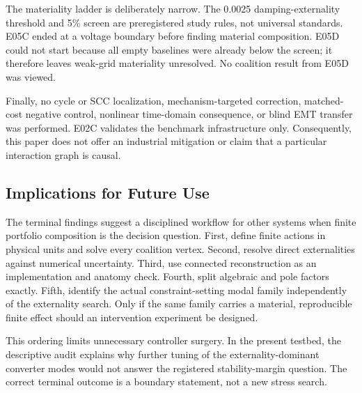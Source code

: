 The materiality ladder is deliberately narrow. The 0.0025 damping-externality
threshold and 5\% screen are preregistered study rules, not universal
standards. E05C ended at a voltage boundary before finding material
composition. E05D could not start because all empty baselines were already
below the screen; it therefore leaves weak-grid materiality unresolved. No
coalition result from E05D was viewed.

Finally, no cycle or SCC localization, mechanism-targeted correction,
matched-cost negative control, nonlinear time-domain consequence, or blind EMT
transfer was performed. E02C validates the benchmark infrastructure only.
Consequently, this paper does not offer an industrial mitigation or claim that
a particular interaction graph is causal.

\subsection{Implications for Future Use}

The terminal findings suggest a disciplined workflow for other systems when
finite portfolio composition is the decision question.
First, define finite actions in physical units and solve every coalition
vertex. Second, resolve direct externalities against numerical uncertainty.
Third, use connected reconstruction as an implementation and anatomy check.
Fourth, split algebraic and pole factors exactly. Fifth, identify the actual
constraint-setting modal family independently of the externality search.
Only if the same family carries a material, reproducible finite effect should
an intervention experiment be designed.

This ordering limits unnecessary controller surgery. In the present testbed,
the descriptive audit explains why further tuning of the externality-dominant
converter modes would not answer the registered stability-margin question.
The correct terminal outcome is a boundary statement, not a new stress search.
